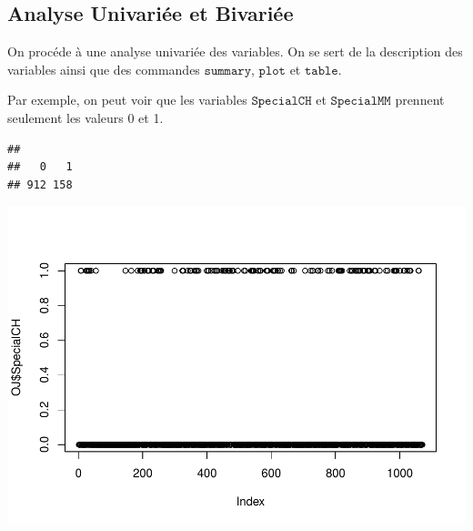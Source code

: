 \documentclass[]{article}
\newenvironment{Shaded}{\begin{snugshade}}{\end{snugshade}}
\newcommand{\KeywordTok}[1]{\textcolor[rgb]{0.13,0.29,0.53}{\textbf{#1}}}
\newcommand{\NormalTok}[1]{#1}
\newcommand{\OperatorTok}[1]{\textcolor[rgb]{0.81,0.36,0.00}{\textbf{#1}}}
\begin{document}
\hypertarget{analyse-univariuxe9e-et-bivariuxe9e}{%
\subsection{Analyse Univariée et
Bivariée}\label{analyse-univariuxe9e-et-bivariuxe9e}}

On procéde à une analyse univariée des variables. On se sert de la
description des variables ainsi que des commandes \(\texttt{summary}\),
\(\texttt{plot}\) et \(\texttt{table}\).

Par exemple, on peut voir que les variables \(\texttt{SpecialCH}\) et
\(\texttt{SpecialMM}\) prennent seulement les valeurs 0 et 1.

\begin{Shaded}
\end{Shaded}

\begin{verbatim}
## 
##   0   1 
## 912 158
\end{verbatim}

\begin{Shaded}
\end{Shaded}

\includegraphics{durand_eltarr_files/figure-latex/unnamed-chunk-3-1.pdf}

\begin{Shaded}
\end{Shaded}
\end{document}

